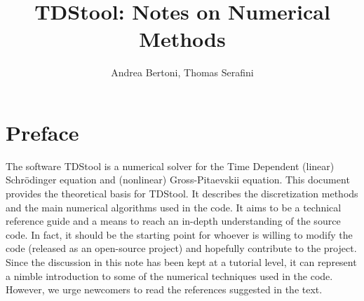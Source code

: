 \documentclass[a4paper,11pt]{article}
\title{TDStool: Notes on Numerical Methods}
\author{Andrea Bertoni, Thomas Serafini}
\begin{document}
\begin{titlepage}



\vspace{40mm}

\vspace{20mm}

\vspace{60mm}

\vspace{10mm}

\normalsize

\newpage

\pagestyle{empty}
\mbox{}
\end{titlepage}

\section*{Preface}
The software TDStool is a numerical solver for the Time Dependent (linear)
Schr\"odinger equation and (nonlinear) Gross-Pitaevskii equation.
This document provides the theoretical basis for TDStool.
It describes the discretization methods and the main numerical
algorithms used in the code. It aims to be a technical reference guide
and a means to reach an in-depth understanding of the source code.
In fact, it should be the starting point for whoever is willing to
modify the code (released as an open-source project) and hopefully contribute
to the project.
Since the discussion in this note has been kept at a tutorial level, 
it can represent a nimble introduction to some of the numerical techniques
used in the code. However, we urge newcomers to read the references
suggested in the text.
\end{document}
